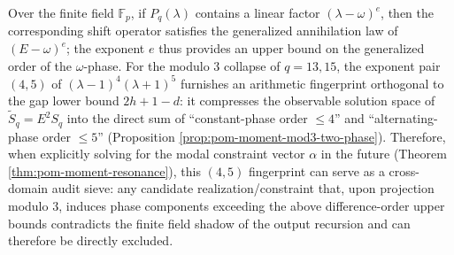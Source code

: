 

\begin{remark}\label{rem:pom-modp-factor-exponent-fingerprint}
Over the finite field \(\mathbb{F}_p\), if \(P_q(\lambda)\) contains a linear factor \((\lambda-\omega)^e\), then the corresponding shift operator satisfies the generalized annihilation law of \((E-\omega)^e\); the exponent \(e\) thus provides an upper bound on the generalized order of the \(\omega\)-phase.
For the modulo \(3\) collapse of \(q=13,15\), the exponent pair \((4,5)\) of \((\lambda-1)^4(\lambda+1)^5\) furnishes an arithmetic fingerprint orthogonal to the gap lower bound \(2h+1-d\): it compresses the observable solution space of \(\widetilde S_q=E^2S_q\) into the direct sum of ``constant-phase order \(\le 4\)'' and ``alternating-phase order \(\le 5\)'' (Proposition \ref{prop:pom-moment-mod3-two-phase}).
Therefore, when explicitly solving for the modal constraint vector \(\alpha\) in the future (Theorem \ref{thm:pom-moment-resonance}), this \((4,5)\) fingerprint can serve as a cross-domain audit sieve: any candidate realization/constraint that, upon projection modulo \(3\), induces phase components exceeding the above difference-order upper bounds contradicts the finite field shadow of the output recursion and can therefore be directly excluded.
\end{remark}

